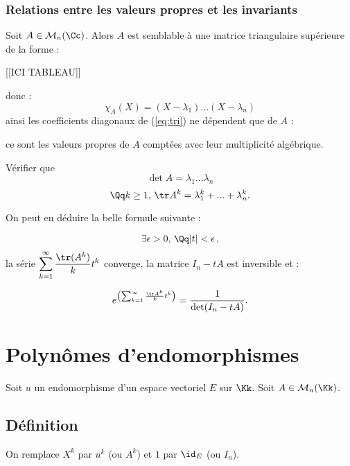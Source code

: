 \documentclass[class=report,crop=false]{standalone}
\begin{document}
\subsection*{Relations entre les valeurs propres et les invariants}

Soit $A\in \mathcal{M}_n(\Cc)$.  Alors $A$ est semblable à une matrice triangulaire supérieure de la forme :

[[ICI TABLEAU]]




donc : 
\[\chi_A(X) = (X-\lambda_1)...(X-\lambda_n)\]
 ainsi les coefficients diagonaux de (\ref{eq:tri}) ne dépendent que de $A$ :  

ce sont les valeurs propres de $A$ comptées avec leur multiplicité algébrique.

\begin{exercicecours}
Vérifier que 
\[\det A = \lambda_1...\lambda_n\]
\[\Qq k \ge 1, \, \tr A^k = \lambda_1^k + ... +\lambda_n^k .\]
\end{exercicecours}

On peut en déduire la belle formule suivante :

\[\exists \epsilon > 0,\, \Qq |t| < \epsilon\,,\]
la série $\displaystyle \sum_{k=1}^\infty \frac{\tr (A^k)}{k}t^k$ converge, la matrice $I_n - t A$ est inversible et :

\[e^{\left(\sum_{k=1}^\infty \frac{\tr A^k}{k}t^k\right)} = \frac{1}{\det(I_n -tA)}.\]

\chapter{Polynômes d'endomorphismes}

Soit $u$ un endomorphisme d'un espace vectoriel $E$ sur $\Kk$. Soit $A \in\mathcal{M}_n(\Kk)$.

\section{Définition}
On remplace $X^k$ par $u^k$ (ou $A^k$) et $1$ par $\id_E$ (ou $I_n$).
\end{document}
